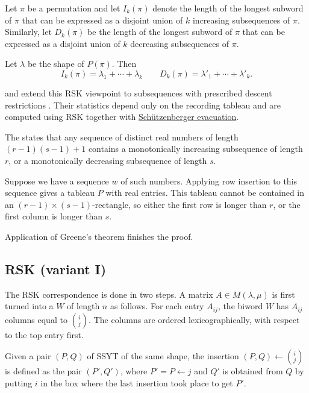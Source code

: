 \begin{theorem}
Let $\pi$ be a permutation and let $I_k(\pi)$
denote the length of the longest subword of $\pi$ that can be
expressed as a disjoint union of $k$ increasing subsequences of $\pi$.
Similarly, let $D_k(\pi)$ be the length of the
longest subword of $\pi$ that can be expressed as a disjoint union of $k$
decreasing subsequences of $\pi$.

Let $\lambda$ be the shape of $P(\pi)$. Then
\[
I_k(\pi) = \lambda_1+\dotsb + \lambda_k \qquad
D_k(\pi) = \lambda'_1+\dotsb + \lambda'_k.
\]
\end{theorem}
 and  extend this RSK viewpoint to
subsequences with prescribed descent restrictions \cite{MenonSingh2026x}.
Their statistics depend only on the recording tableau and are computed using
RSK together with \hyperref[evacuation]{Schützenberger evacuation}.


\begin{example*}

The \label{erdosSzekeresTheorem}
\cite{ErdosSzekeres2009}
states that any sequence of distinct real numbers of length $(r-1)(s-1)+1$
contains a monotonically increasing subsequence of length $r$,
or a monotonically decreasing subsequence of length $s$.

Suppose we have a sequence $w$ of such numbers.  Applying row insertion to
this sequence gives a tableau $P$ with real entries.
This tableau cannot be contained in an $(r-1)\times (s-1)$-rectangle,
so either the first row is longer than $r$, or the first column is longer than $s$.

Application of Greene's theorem finishes the proof.
\end{example*}



\subsection[rskOne]{RSK (variant I)}

The RSK correspondence is done in two steps.
A matrix $A \in M(\lambda,\mu)$ is first turned into a
\label{biword} $W$ of length $n$ as follows.
For each entry $A_{ij}$, the biword $W$ has $A_{ij}$ columns equal to
$\binom{i}{j}$.
The columns are ordered lexicographically, with respect to the top entry first.

Given a pair $(P,Q)$ of SSYT of the same shape,
the insertion $(P,Q) \leftarrow \binom{i}{j}$ is defined as the pair $(P',Q')$,
where $P' =  P \leftarrow j$ and $Q'$ is obtained from $Q$ by putting $i$
in the box where the last insertion took place to get $P'$.

